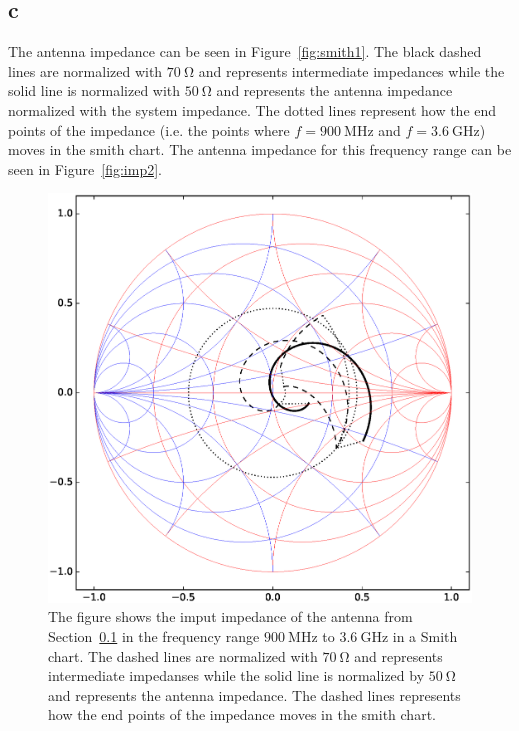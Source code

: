 \documentclass{article}
\begin{document}
\subsection{c}\label{sec:c}
The antenna impedance can be seen in Figure~\ref{fig:smith1}. The black dashed lines are normalized with $\SI{70}{\ohm}$ and represents intermediate impedances while the solid line is normalized with $\SI{50}{\ohm}$ and represents the antenna impedance normalized with the system impedance. The dotted lines represent how the end points of the impedance (i.e. the points where $f=\SI{900}{\mega\hertz}$ and $f=\SI{3.6}{\giga\hertz}$) moves in the smith chart. The antenna impedance for this frequency range can be seen in Figure~\ref{fig:imp2}.
\begin{figure}
  \centering
  \includegraphics[width=\textwidth]{SmithChart2.eps}
  \caption{The figure shows the imput impedance of the antenna from Section~\ref{sec:c} in the frequency range $\SI{900}{\mega\hertz}$ to $\SI{3.6}{\giga\hertz}$ in a Smith chart. The dashed lines are normalized with $\SI{70}{\ohm}$ and represents intermediate impedanses while the solid line is normalized by $\SI{50}{\ohm}$ and represents the antenna impedance. The dashed lines represents how the end points of the impedance moves in the smith chart.}
  \label{fig:smith2}
\end{figure}
\end{document}
